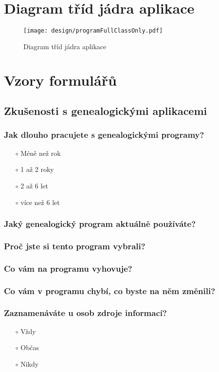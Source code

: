 \chapter{Diagram tříd jádra aplikace}
\label{append:designKernel}
\begin{figure}[H]
	\centering
	\texttt{[image: design/programFullClassOnly.pdf]}
	\caption{Diagram tříd jádra aplikace}
\end{figure}




\chapter{Vzory formulářů}
	\section{Zkušenosti s genealogickými aplikacemi}
		\label{append:formZkusenosti}
		\subsection*{Jak dlouho pracujete s genealogickými programy?}
		\begin{itemize}
			\item[$\circ$] Méně než rok
			\item[$\circ$] 1 až 2 roky
			\item[$\circ$] 2 až 6 let
			\item[$\circ$] více než 6 let
		\end{itemize}
		\subsection*{Jaký genealogický program aktuálně používáte?}
		\dotfill
		\subsection*{Proč jste si tento program vybrali?}
		\dotfill
		\subsection*{Co vám na programu vyhovuje?}
		\dotfill
		\subsection*{Co vám v programu chybí, co byste na něm změnili?}
		\dotfill
		\subsection*{Zaznamenáváte u osob zdroje informací?}
		\begin{itemize}
			\item[$\circ$] Vždy
			\item[$\circ$] Občas
			\item[$\circ$] Nikdy
		\end{itemize}
